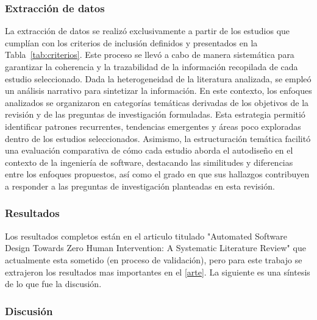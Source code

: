 \documentclass[12pt, letterpaper, oneside]{book}
\begin{document}
\subsubsection{Extracción de datos}

La extracción de datos se realizó exclusivamente a partir de los estudios que cumplían con los criterios de inclusión definidos y presentados en la Tabla~\ref{tab:criterios}. Este proceso se llevó a cabo de manera sistemática para garantizar la coherencia y la trazabilidad de la información recopilada de cada estudio seleccionado. Dada la heterogeneidad de la literatura analizada, se empleó un análisis narrativo para sintetizar la información. En este contexto, los enfoques analizados se organizaron en categorías temáticas derivadas de los objetivos de la revisión y de las preguntas de investigación formuladas. Esta estrategia permitió identificar patrones recurrentes, tendencias emergentes y áreas poco exploradas dentro de los estudios seleccionados. Asimismo, la estructuración temática facilitó una evaluación comparativa de cómo cada estudio aborda el autodiseño en el contexto de la ingeniería de software, destacando las similitudes y diferencias entre los enfoques propuestos, así como el grado en que sus hallazgos contribuyen a responder a las preguntas de investigación planteadas en esta revisión.

\subsubsection{Resultados}

Los resultados completos están en el articulo titulado "Automated Software Design Towards Zero Human Intervention: A Systematic Literature Review" que actualmente esta sometido (en proceso de validación), pero para este trabajo se extrajeron los resultados mas importantes en el \cref{arte}. La siguiente es una síntesis de lo que fue la discusión.

\subsubsection{Discusión}
\end{document}
